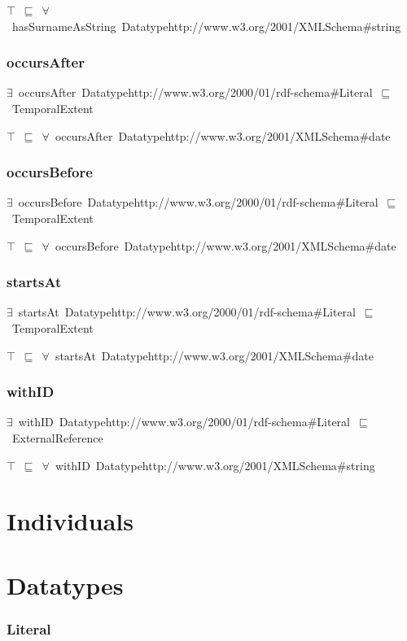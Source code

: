 \documentclass{article}
\begin{document}
\ensuremath{\top}~\ensuremath{\sqsubseteq}~\ensuremath{\forall}~hasSurnameAsString~Datatypehttp://www.w3.org/2001/XMLSchema#string

\subsubsection*{occursAfter}

\ensuremath{\exists}~occursAfter~Datatypehttp://www.w3.org/2000/01/rdf-schema#Literal~\ensuremath{\sqsubseteq}~TemporalExtent

\ensuremath{\top}~\ensuremath{\sqsubseteq}~\ensuremath{\forall}~occursAfter~Datatypehttp://www.w3.org/2001/XMLSchema#date

\subsubsection*{occursBefore}

\ensuremath{\exists}~occursBefore~Datatypehttp://www.w3.org/2000/01/rdf-schema#Literal~\ensuremath{\sqsubseteq}~TemporalExtent

\ensuremath{\top}~\ensuremath{\sqsubseteq}~\ensuremath{\forall}~occursBefore~Datatypehttp://www.w3.org/2001/XMLSchema#date

\subsubsection*{startsAt}

\ensuremath{\exists}~startsAt~Datatypehttp://www.w3.org/2000/01/rdf-schema#Literal~\ensuremath{\sqsubseteq}~TemporalExtent

\ensuremath{\top}~\ensuremath{\sqsubseteq}~\ensuremath{\forall}~startsAt~Datatypehttp://www.w3.org/2001/XMLSchema#date

\subsubsection*{withID}

\ensuremath{\exists}~withID~Datatypehttp://www.w3.org/2000/01/rdf-schema#Literal~\ensuremath{\sqsubseteq}~ExternalReference

\ensuremath{\top}~\ensuremath{\sqsubseteq}~\ensuremath{\forall}~withID~Datatypehttp://www.w3.org/2001/XMLSchema#string

\section*{Individuals}\section*{Datatypes}\subsubsection*{Literal}
\end{document}
